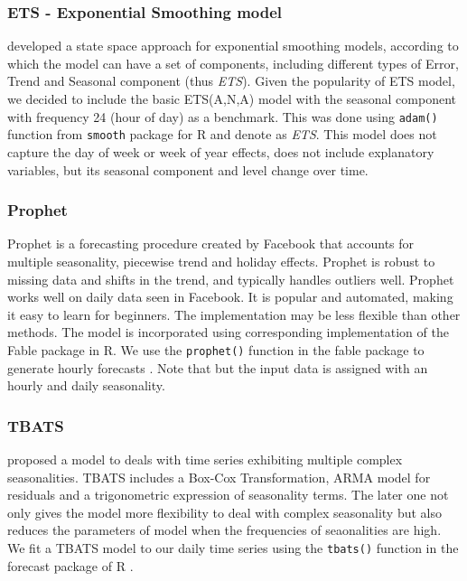 \documentclass[]{elsarticle} %
\begin{document}
\hypertarget{ets---exponential-smoothing-model}{%
\subsubsection{ETS - Exponential Smoothing model}\label{ets---exponential-smoothing-model}}

\citet{Hyndman2008b} developed a state space approach for exponential smoothing models, according to which the model can have a set of components, including different types of Error, Trend and Seasonal component (thus \emph{ETS}). Given the popularity of ETS model, we decided to include the basic ETS(A,N,A) model with the seasonal component with frequency 24 (hour of day) as a benchmark. This was done using \texttt{adam()} function from \texttt{smooth} package \citep{Svetunkov2021Smooth} for R and denote as \emph{ETS}. This model does not capture the day of week or week of year effects, does not include explanatory variables, but its seasonal component and level change over time.

\hypertarget{prophet}{%
\subsubsection{Prophet}\label{prophet}}

Prophet is a forecasting procedure created by Facebook \citep{taylor2018forecasting} that accounts for multiple seasonality, piecewise trend and holiday effects. Prophet is robust to missing data and shifts in the trend, and typically handles outliers well. Prophet works well on daily data seen in Facebook. It is popular and automated, making it easy to learn for beginners. The implementation may be less flexible than other methods.
The model is incorporated using corresponding implementation of the Fable package in R. We use the \texttt{prophet()} function in the fable package to generate hourly forecasts \citep{fable2020}. Note that but the input data is assigned with an hourly and daily seasonality.

\hypertarget{tbats}{%
\subsubsection{TBATS}\label{tbats}}

\citet{de2011forecasting} proposed a model to deals with time series exhibiting multiple complex seasonalities. TBATS includes a Box-Cox Transformation, ARMA model for residuals and a trigonometric expression of seasonality terms. The later one not only gives the model more flexibility to deal with complex seasonality but also reduces the parameters of model when the frequencies of seaonalities are high. We fit a TBATS model to our daily time series using the \texttt{tbats()} function in the forecast package of R \citep{forecastpackage2020}.
\end{document}
